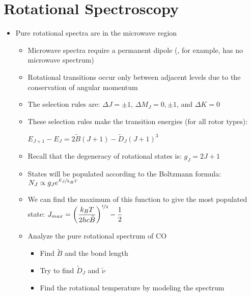 \documentclass[12pt, openany, letterpaper]{memoir}
\begin{document}
\section{Rotational Spectroscopy}
\begin{itemize}
	\item Pure rotational spectra are in the microwave region
	\begin{itemize}
		\item Microwave spectra require a permanent dipole (, for example, has no microwave spectrum)
		\item Rotational transitions occur only between adjacent levels due to the conservation of angular momentum
		\item The selection rules are: $\Delta J=\pm 1$, $\Delta M_J=0,\pm1$, and $\Delta K=0$
		\item These selection rules make the transition energies (for all rotor types): 
		
		$E_{J+1}-E_J = 2\tilde{B}(J+1) - \tilde{D}_J(J+1)^3$
		\item Recall that the degeneracy of rotational states is: $g_J=2J+1$		
		\item States will be populated according to the Boltzmann formula: $N_J\propto g_Je^{\nicefrac{E_J}{k_BT}}$
		\item We can find the maximum of this function to give the most populated state: $J_{max}=\left(\dfrac{k_BT}{2hc\tilde{B}}\right)^{\nicefrac{1}{2}}-\dfrac{1}{2}$
		\item Analyze the pure rotational spectrum of CO
		\begin{itemize}
			\item Find $\tilde{B}$ and the bond length
			\item Try to find $\tilde{D}_J$ and $\tilde{\nu}$
			\item Find the rotational temperature by modeling the spectrum
		\end{itemize}
	\end{itemize}
\end{itemize}
\end{document}
